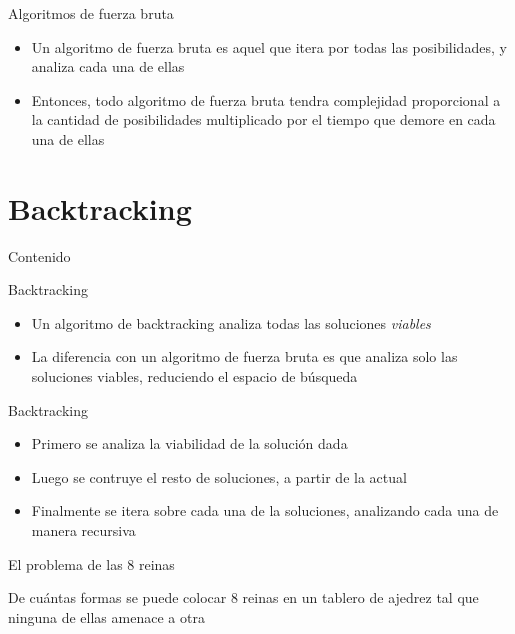 \documentclass[handout]{beamer}
\begin{document}
\begin{frame}{Algoritmos de fuerza bruta}
  \begin{itemize}
    \item Un algoritmo de fuerza bruta es aquel que itera por todas las posibilidades, y analiza cada una de ellas
      \pause
    \item Entonces, todo algoritmo de fuerza bruta tendra complejidad proporcional a la cantidad de posibilidades multiplicado por el tiempo que demore en cada una de ellas
  \end{itemize}
\end{frame}

\section{Backtracking}
\begin{frame}{Contenido}
\tableofcontents[currentsection]
\end{frame}

\begin{frame}{Backtracking}
  \begin{itemize}
    \item Un algoritmo de backtracking analiza todas las soluciones \textit{viables}
      \pause
    \item La diferencia con un algoritmo de fuerza bruta es que analiza solo las soluciones viables, reduciendo el espacio de b\'usqueda
  \end{itemize}
\end{frame}

\begin{frame}{Backtracking}
  \begin{itemize}
    \item Primero se analiza la viabilidad de la soluci\'on dada
      \pause
    \item Luego se contruye el resto de soluciones, a partir de la actual
      \pause
    \item Finalmente se itera sobre cada una de la soluciones, analizando cada una de manera recursiva
  \end{itemize}
\end{frame}

\begin{frame}{El problema de las 8 reinas}
  \begin{definition}
    De cu\'antas formas se puede colocar 8 reinas en un tablero de ajedrez tal que ninguna de ellas amenace a otra
  \end{definition}
\end{frame}

\begin{frame}
\end{frame}
\end{document}
